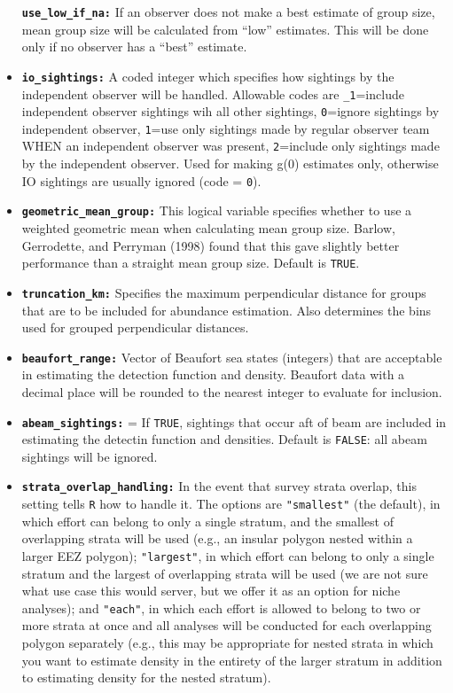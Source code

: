 \documentclass[
]{book}
\begin{document}
\begin{itemize}
  \textbf{\texttt{use\_low\_if\_na:}} If an observer does not make a best estimate of group size, mean group size will be calculated from ``low'' estimates. This will be done only if no observer has a ``best'' estimate.
\item
  \textbf{\texttt{io\_sightings:}} A coded integer which specifies how sightings by the independent observer will be handled. Allowable codes are \texttt{\_1}=include independent observer sightings wih all other sightings, \texttt{0}=ignore sightings by independent observer, \texttt{1}=use only sightings made by regular observer team WHEN an independent observer was present, \texttt{2}=include only sightings made by the independent observer. Used for making g(0) estimates only, otherwise IO sightings are usually ignored (code = \texttt{0}).
\item
  \textbf{\texttt{geometric\_mean\_group:}} This logical variable specifies whether to use a weighted geometric mean when calculating mean group size. Barlow, Gerrodette, and Perryman (1998) found that this gave slightly better performance than a straight mean group size. Default is \texttt{TRUE}.
\item
  \textbf{\texttt{truncation\_km:}} Specifies the maximum perpendicular distance for groups that are to be included for abundance estimation. Also determines the bins used for grouped perpendicular distances.
\item
  \textbf{\texttt{beaufort\_range:}} Vector of Beaufort sea states (integers) that are acceptable in estimating the detection function and density. Beaufort data with a decimal place will be rounded to the nearest integer to evaluate for inclusion.
\item
  \textbf{\texttt{abeam\_sightings:}} = If \texttt{TRUE}, sightings that occur aft of beam are included in estimating the detectin function and densities. Default is \texttt{FALSE}: all abeam sightings will be ignored.
\item
  \textbf{\texttt{strata\_overlap\_handling:}} In the event that survey strata overlap, this setting tells \texttt{R} how to handle it. The options are \texttt{"smallest"} (the default), in which effort can belong to only a single stratum, and the smallest of overlapping strata will be used (e.g., an insular polygon nested within a larger EEZ polygon); \texttt{"largest"}, in which effort can belong to only a single stratum and the largest of overlapping strata will be used (we are not sure what use case this would server, but we offer it as an option for niche analyses); and \texttt{"each"}, in which each effort is allowed to belong to two or more strata at once and all analyses will be conducted for each overlapping polygon separately (e.g., this may be appropriate for nested strata in which you want to estimate density in the entirety of the larger stratum in addition to estimating density for the nested stratum).

\end{itemize}
\end{document}
